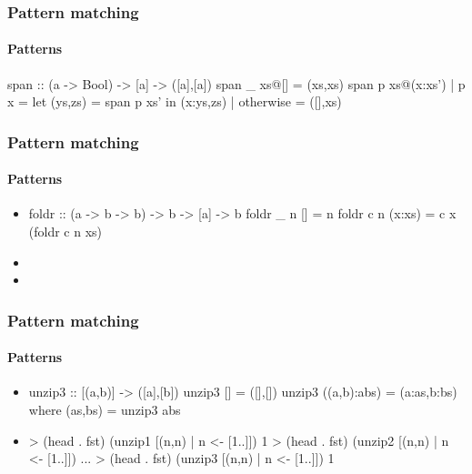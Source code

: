 \documentclass{beamer}
\begin{document}

\begin{frame}[fragile]
  \frametitle{Pattern matching}
  \framesubtitle{Patterns}

  \begin{example}
    \begin{code}
span :: (a -> Bool) -> [a] -> ([a],[a])
span _ xs@[]       = (xs,xs)
span p xs@(x:xs')
  | p x            = let (ys,zs) = span p xs' in (x:ys,zs)
  | otherwise      = ([],xs)
    \end{code}
  \end{example}
\end{frame}

\begin{frame}[fragile]
  \frametitle{Pattern matching}
  \framesubtitle{Patterns}

  \begin{example}
    \begin{itemize}
    \item
      \begin{code}
foldr :: (a -> b -> b) -> b -> [a] -> b
foldr _ n []     = n
foldr c n (x:xs) = c x (foldr c n xs)
      \end{code}
    \item
    \item
    \end{itemize}
  \end{example}
\end{frame}

\begin{frame}[fragile]
  \frametitle{Pattern matching}
  \framesubtitle{Patterns}

  \begin{example}
    \begin{itemize}
    \item
      \begin{code}
unzip3 :: [(a,b)] -> ([a],[b])
unzip3 []          = ([],[])
unzip3 ((a,b):abs) = (a:as,b:bs) where (as,bs) = unzip3 abs
      \end{code}
    \item
      \begin{code}
> (head . fst) (unzip1 [(n,n) | n <- [1..]])
1
> (head . fst) (unzip2 [(n,n) | n <- [1..]])
...
> (head . fst) (unzip3 [(n,n) | n <- [1..]])
1
      \end{code}
    \end{itemize}
  \end{example}
\end{frame}
\end{document}
